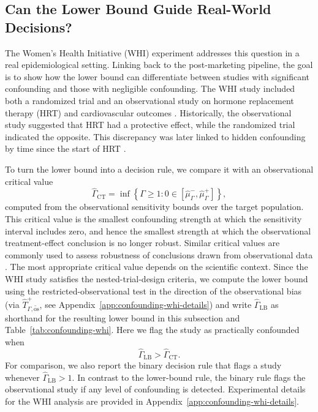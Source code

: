 \FloatBarrier

\subsection{Can the Lower Bound Guide Real-World Decisions?}
\label{sec:confounding-real-world}

The Women's Health Initiative (WHI) experiment addresses this question in a real epidemiological setting. Linking back to the post-marketing pipeline, the goal is to show how the lower bound can differentiate between studies with significant confounding and those with negligible confounding. The WHI study included both a randomized trial and an observational study on hormone replacement therapy (HRT) and cardiovascular outcomes \citep{anderson2003implementation}. Historically, the observational study suggested that HRT had a protective effect, while the randomized trial indicated the opposite. This discrepancy was later linked to hidden confounding by time since the start of HRT \citep{vandenbroucke2009hrt}.

To turn the lower bound into a decision rule, we compare it with an observational critical value
\[
  \widehat{\Gamma}_{\mathrm{CT}}
  =
  \inf
  \left\{
    \Gamma \geq 1:
    0
    \in
    [
      \widehat{\mu}^-_{\Gamma},
      \widehat{\mu}^+_{\Gamma}
    ]
  \right\},
\]
computed from the observational sensitivity bounds over the target population. This critical value is the smallest confounding strength at which the sensitivity interval includes zero, and hence the smallest strength at which the observational treatment-effect conclusion is no longer robust. Similar critical values are commonly used to assess robustness of conclusions drawn from observational data \citep{vanderweele2017sensitivity,jin2023sensitivity}. The most appropriate critical value depends on the scientific context. Since the WHI study satisfies the nested-trial-design criteria, we compute the lower bound using the restricted-observational test in the direction of the observational bias (via \(\widehat{T}^+_{\Gamma,\widetilde{\mathrm{os}}}\), see Appendix~\ref{app:confounding-whi-details}) and write \(\widehat{\Gamma}_{\mathrm{LB}}\) as shorthand for the resulting lower bound in this subsection and Table~\ref{tab:confounding-whi}. Here we flag the study as practically confounded when
\[
  \widehat{\Gamma}_{\mathrm{LB}}
  >
  \widehat{\Gamma}_{\mathrm{CT}}.
\]
For comparison, we also report the binary decision rule that flags a study whenever \(\widehat{\Gamma}_{\mathrm{LB}}>1\). In contrast to the lower-bound rule, the binary rule flags the observational study if any level of confounding is detected. Experimental details for the WHI analysis are provided in Appendix~\ref{app:confounding-whi-details}.

